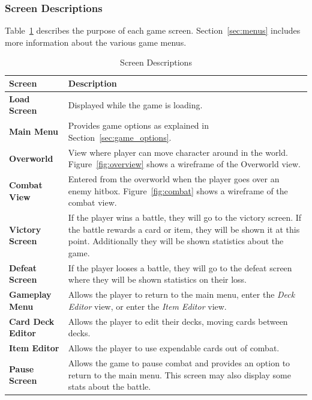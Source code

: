 \documentclass[12pt,titlepage]{article}
\begin{document}
\subsubsection{Screen Descriptions}
%
Table~\ref{tab:screen_purpose} describes the purpose of each game screen.
Section~\ref{sec:menus} includes more information about the various game menus.
\begin{table}[H]
    \centering
    \caption{Screen Descriptions}
    \label{tab:screen_purpose}
    \begin{tabularx}{\textwidth}{|l | X |}
        \hline
        \textbf{Screen} & \textbf{Description} \\
        \hline\hline
        \textbf{Load Screen} & Displayed while the game is loading. \\
        \hline
        \textbf{Main Menu} & Provides game options as explained in
        Section~\ref{sec:game_options}. \\
        \hline
        \textbf{Overworld} & View where player can move character around in the
        world. Figure~\ref{fig:overview} shows a wireframe of the Overworld
        view. \\
        \hline
        \textbf{Combat View} & Entered from the overworld when the player goes
        over an enemy hitbox. Figure~\ref{fig:combat} shows a wireframe of the
        combat view. \\
        \hline
        \textbf{Victory Screen} & If the player wins a battle, they will go to
        the victory screen. If the battle rewards a card or item, they will be
        shown it at this point. Additionally they will be shown statistics about
        the game. \\
        \hline
        \textbf{Defeat Screen} & If the player looses a battle, they will go to
        the defeat screen where they will be shown statistics on their loss. \\
        \hline
        \textbf{Gameplay Menu} & Allows the player to return to the main menu,
        enter the \textit{Deck Editor} view, or enter the \textit{Item Editor}
        view. \\
        \hline
        \textbf{Card Deck Editor} & Allows the player to edit their decks,
        moving cards between decks. \\
        \hline
        \textbf{Item Editor} & Allows the player to use expendable cards out of
        combat. \\
        \hline
        \textbf{Pause Screen} & Allows the game to pause combat and provides an
        option to return to the main menu. This screen may also display some
        stats about the battle. \\
        \hline
    \end{tabularx}
\end{table}
\end{document}
